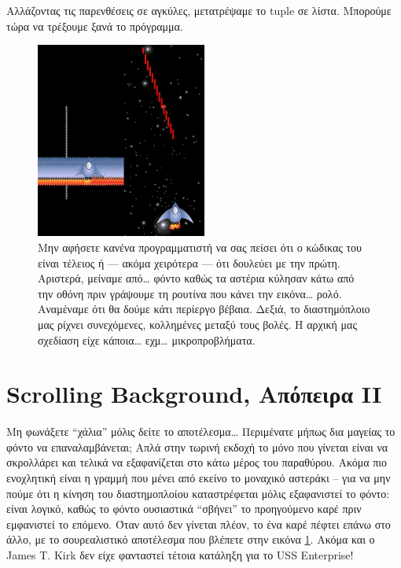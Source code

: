 Αλλάζοντας τις παρενθέσεις σε αγκύλες, μετατρέψαμε το tuple σε λίστα. Μπορούμε τώρα να τρέξουμε ξανά το πρόγραμμα.

\begin{figure}
\centering
\includegraphics[width=0.5\textwidth]{images/chapter8/mess}
\caption[Χαλασμένο Laser!]{Μην αφήσετε κανένα προγραμματιστή να σας πείσει ότι ο κώδικας του είναι τέλειος ή --- ακόμα χειρότερα --- ότι δουλεύει με την πρώτη. Αριστερά, μείναμε από\ldots{} φόντο καθώς τα αστέρια κύλησαν κάτω από την οθόνη πριν γράψουμε τη ρουτίνα που κάνει την εικόνα\ldots{} ρολό. Αναμέναμε ότι θα δούμε κάτι περίεργο βέβαια. Δεξιά, το διαστημόπλοιο μας ρίχνει συνεχόμενες, κολλημένες μεταξύ τους βολές. Η αρχική μας σχεδίαση είχε κάποια\ldots{} εχμ\ldots{} μικροπροβλήματα.}
\label{8-3}
\end{figure}
%
\section{Scrolling Background, Απόπειρα II}

Μη φωνάξετε ``χάλια'' μόλις δείτε το αποτέλεσμα\ldots{} Περιμένατε μήπως δια μαγείας το φόντο να επαναλαμβάνεται; Απλά στην τωρινή εκδοχή το μόνο που γίνεται είναι να σκρολλάρει και τελικά να εξαφανίζεται στο κάτω μέρος του παραθύρου. Ακόμα πιο ενοχλητική είναι η γραμμή που μένει από εκείνο το μοναχικό αστεράκι -- για να μην πούμε ότι η κίνηση του διαστημοπλοίου καταστρέφεται μόλις εξαφανιστεί το φόντο: είναι λογικό, καθώς το φόντο ουσιαστικά ``σβήνει'' το προηγούμενο καρέ πριν εμφανιστεί το επόμενο. Όταν αυτό δεν γίνεται πλέον, το ένα καρέ πέφτει επάνω στο άλλο, με το σουρεαλιστικό αποτέλεσμα που βλέπετε στην εικόνα \ref{8-3}. Ακόμα και ο James T. Kirk δεν είχε φανταστεί τέτοια κατάληξη για το USS Enterprise!

